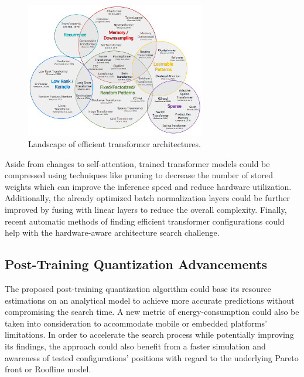 \begin{figure}[hpt!]
  \centering
  \includegraphics[trim={0cm 0cm 0cm 0cm}, clip, width=0.7\textwidth, center]{conclusion/transformer_landscape.png}
  \caption{Landscape of efficient transformer architectures.}
  \label{fig:transformer-landscape}
\end{figure}

Aside from changes to self-attention, trained transformer models could be compressed using techniques like pruning to decrease the number of stored weights which can improve the inference speed and reduce hardware utilization. Additionally, the already optimized batch normalization layers could be further improved by fusing with linear layers to reduce the overall complexity. Finally, recent automatic methods of finding efficient transformer configurations \cite{83-tsai2020finding,84-su2021vitas:} could help with the hardware-aware architecture search challenge.

\subsection{Post-Training Quantization Advancements}
The proposed post-training quantization algorithm could base its resource estimations on an analytical model to achieve more accurate predictions without compromising the search time. A new metric of energy-consumption could also be taken into consideration to accommodate mobile or embedded platforms' limitations. In order to accelerate the search process while potentially improving its findings, the approach could also benefit from a faster simulation and awareness of tested configurations' positions with regard to the underlying Pareto front or Roofline model.

